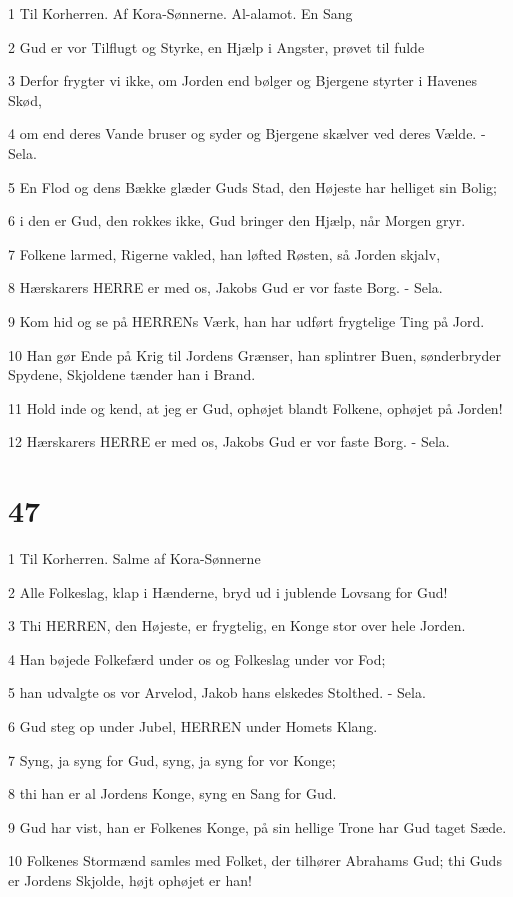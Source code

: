 \par 1 Til Korherren. Af Kora-Sønnerne. Al-alamot. En Sang
\par 2 Gud er vor Tilflugt og Styrke, en Hjælp i Angster, prøvet til fulde
\par 3 Derfor frygter vi ikke, om Jorden end bølger og Bjergene styrter i Havenes Skød,
\par 4 om end deres Vande bruser og syder og Bjergene skælver ved deres Vælde. - Sela.
\par 5 En Flod og dens Bække glæder Guds Stad, den Højeste har helliget sin Bolig;
\par 6 i den er Gud, den rokkes ikke, Gud bringer den Hjælp, når Morgen gryr.
\par 7 Folkene larmed, Rigerne vakled, han løfted Røsten, så Jorden skjalv,
\par 8 Hærskarers HERRE er med os, Jakobs Gud er vor faste Borg. - Sela.
\par 9 Kom hid og se på HERRENs Værk, han har udført frygtelige Ting på Jord.
\par 10 Han gør Ende på Krig til Jordens Grænser, han splintrer Buen, sønderbryder Spydene, Skjoldene tænder han i Brand.
\par 11 Hold inde og kend, at jeg er Gud, ophøjet blandt Folkene, ophøjet på Jorden!
\par 12 Hærskarers HERRE er med os, Jakobs Gud er vor faste Borg. - Sela.

\chapter{47}

\par 1 Til Korherren. Salme af Kora-Sønnerne
\par 2 Alle Folkeslag, klap i Hænderne, bryd ud i jublende Lovsang for Gud!
\par 3 Thi HERREN, den Højeste, er frygtelig, en Konge stor over hele Jorden.
\par 4 Han bøjede Folkefærd under os og Folkeslag under vor Fod;
\par 5 han udvalgte os vor Arvelod, Jakob hans elskedes Stolthed. - Sela.
\par 6 Gud steg op under Jubel, HERREN under Homets Klang.
\par 7 Syng, ja syng for Gud, syng, ja syng for vor Konge;
\par 8 thi han er al Jordens Konge, syng en Sang for Gud.
\par 9 Gud har vist, han er Folkenes Konge, på sin hellige Trone har Gud taget Sæde.
\par 10 Folkenes Stormænd samles med Folket, der tilhører Abrahams Gud; thi Guds er Jordens Skjolde, højt ophøjet er han!

